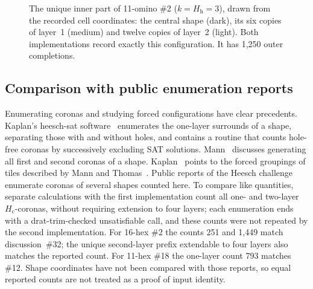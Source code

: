 \documentclass[10pt,a4paper]{article}
\theoremstyle{definition}
\theoremstyle{remark}
\newcommand{\Hc}{H_{\mathrm c}}
\newcommand{\Hh}{H_{\mathrm h}}
\begin{document}
\begin{figure}[!htbp]
\caption{The unique inner part of 11-omino \#2 ($k=\Hh=3$), drawn from the
recorded cell coordinates: the central shape (dark), its six copies of
layer~1 (medium) and twelve copies of layer~2 (light). Both
implementations record exactly this configuration. It has 1,250 outer
completions.}
\label{fig:inner}
\end{figure}

\subsection{Comparison with public enumeration reports}
Enumerating coronas and studying forced configurations have clear
precedents. Kaplan's heesch-sat software~\cite{heeschsat} enumerates the
one-layer surrounds of a shape, separating those with and without holes,
and contains a routine that counts hole-free coronas by successively
excluding SAT solutions. Mann~\cite{Mann} discusses generating all first
and second coronas of a shape. Kaplan~\cite[p.~170 of the journal
version]{Kaplan} points to the forced groupings of tiles described by
Mann and Thomas~\cite{MannThomas}. Public reports of the Heesch
challenge~\cite{LayrReports} enumerate coronas of several shapes counted
here. To compare like quantities, separate calculations with the first
implementation count all one- and two-layer $\Hc$-coronas, without
requiring extension to four layers; each enumeration ends with a
drat-trim-checked unsatisfiable call, and these counts were not repeated
by the second implementation.
For 16-hex \#2 the counts 251 and 1,449 match discussion~\#32; the
unique second-layer prefix extendable to four layers also matches the
reported count. For 11-hex \#18 the one-layer count 793 matches
\#12. Shape coordinates have not been compared with those reports,
so equal reported counts are not treated as a proof of input identity.
\end{document}
